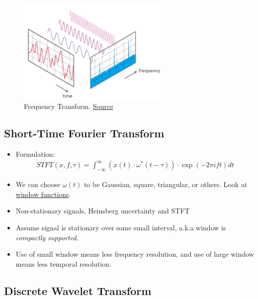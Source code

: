 \documentclass[paper=a4, fontsize=12pt]{scrartcl} %
\numberwithin{equation}{section} %
\numberwithin{figure}{section} %
\numberwithin{table}{section} %
\begin{document}
\begin{figure}[H]
    \centering
    \includegraphics[width=0.65\textwidth]{images/freq}
    \caption{Frequency Transform. \href{https://towardsdatascience.com/fourier-transformation-and-its-mathematics-fff54a6f6659}{Source}}
\end{figure}

\subsection{Short-Time Fourier Transform}

\begin{itemize}
    \item Formulation:
    \begin{align*}
        STFT(x, f, \tau) = \int_{-\infty}^{\infty} \left( x(t) \cdot \omega^*(t - \tau) \right) \cdot \exp \left( -2 \pi i f t \right) dt
    \end{align*}
    \item We can choose $\omega(t)$ to be Gaussian, square, triangular, or others. Look at \href{https://en.wikipedia.org/wiki/Window_function}{window functions}.
    \item Non-stationary signals, Heinsberg uncertainty and STFT
    \item Assume signal is stationary over some small interval, a.k.a window is \textit{compactly supported}.
    \item Use of small window means less frequency resolution, and use of large window means less temporal resolution.
\end{itemize}

\subsection{Discrete Wavelet Transform}
\end{document}
